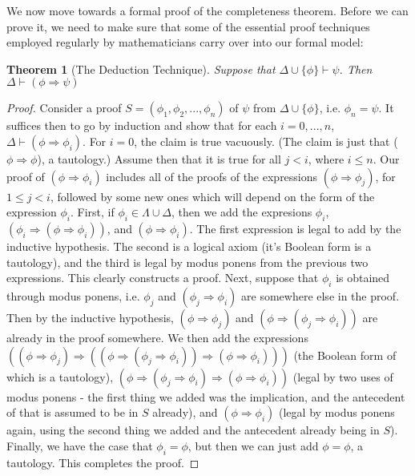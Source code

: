 \documentclass{article}
\theoremstyle{definition}
\theoremstyle{plain}
\theoremstyle{theorem}
\newtheorem{theorem}{Theorem}[section]
\begin{document}
\par We now move towards a formal proof of the completeness theorem. Before we can prove it, we need to make sure that some of the essential proof techniques employed regularly by mathematicians carry over into our formal model:
\begin{theorem}[The Deduction Technique]
    Suppose that $\Delta \cup \{\phi\} \vdash \psi$. Then $\Delta \vdash (\phi \Rightarrow \psi)$
\end{theorem}
\begin{proof}
    Consider a proof $S = (\phi_1,\phi_2,...,\phi_n)$ of $\psi$ from $\Delta \cup \{\phi\}$, i.e. $\phi_n  = \psi$. It suffices then to go by induction and show that for each $i = 0,...,n$, $\Delta \vdash (\phi \Rightarrow \phi_i)$. For $i=0$, the claim is true vacuously. (The claim is just that ($\phi \Rightarrow \phi$), a tautology.) Assume then that it is true for all $j < i$, where $i \leq n$. Our proof of $(\phi \Rightarrow \phi_i)$ includes all of the proofs of the expressions $(\phi \Rightarrow \phi_j)$, for $1\leq j < i$, followed by some new ones which will depend on the form of the expression $\phi_i$. First, if $\phi_i \in \Lambda \cup \Delta$, then we add the expresions $\phi_i$, $(\phi_i \Rightarrow (\phi \Rightarrow \phi_i))$, and $(\phi \Rightarrow \phi_i)$. The first expression is legal to add by the inductive hypothesis. The second is a logical axiom (it's Boolean form is a tautology), and the third is legal by modus ponens from the previous two expressions. This clearly constructs a proof. Next, suppose that $\phi_i$ is obtained through modus ponens, i.e. $\phi_j$ and $(\phi_j \Rightarrow \phi_i)$ are somewhere else in the proof. Then by the inductive hypothesis, $(\phi \Rightarrow \phi_j)$ and $(\phi \Rightarrow (\phi_j \Rightarrow \phi_i))$ are already in the proof somewhere. We then add the expressions $((\phi \Rightarrow \phi_j) \Rightarrow ((\phi \Rightarrow (\phi_j \Rightarrow \phi_i)) \Rightarrow (\phi \Rightarrow \phi_i)))$ (the Boolean form of which is a tautology), $(\phi \Rightarrow (\phi_j \Rightarrow \phi_i) \Rightarrow (\phi \Rightarrow \phi_i))$ (legal by two uses of modus ponens - the first thing we added was the implication, and the antecedent of that is assumed to be in $S$ already), and $(\phi \Rightarrow \phi_i)$ (legal by modus ponens again, using the second thing we added and the antecedent already being in $S$). Finally, we have the case that $\phi_i = \phi$, but then we can just add $\phi = \phi$, a tautology. This completes the proof.
\end{proof}
\end{document}
